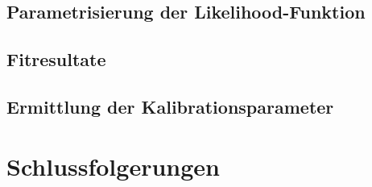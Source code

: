 \subsection{Parametrisierung der Likelihood-Funktion}



\subsection{Fitresultate}


\subsection{Ermittlung der Kalibrationsparameter}


\section{Schlussfolgerungen}

